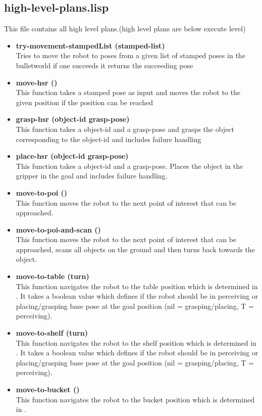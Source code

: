 \documentclass[main.tex]{subfiles}
\begin{document}
	    \subsection{high-level-plans.lisp}
	    \label{high-level}
	    This file contains all high level plans.(high level plans are below execute level)
	    \begin{itemize}
		\item \textbf{try-movement-stampedList (stamped-list)} \\
		Tries to move the robot to poses from a given list of stamped poses in the bulletworld if one succeeds it returns the succeeding pose 
	    \item \textbf{move-hsr ()} \\
	    This function takes a stamped pose as input and moves the robot to the given position if the position can be reached
	    \item \textbf{grasp-hsr (object-id grasp-pose)} \\
	    This function takes a object-id and a grasp-pose and grasps the object corresponding to the object-id and includes failure handling
	    \item \textbf{place-hsr (object-id grasp-pose)} \\
	    This function takes a object-id and a grasp-pose. Places the object in the gripper in the goal and includes failure handling.
	    \item \textbf{move-to-poi ()} \\
	    This function moves the robot to the next point of interest that can be approached. 
	    \item \textbf{move-to-poi-and-scan ()} \\
	    This function moves the robot to the next point of interest that can be approached, scans all objects on the ground and then turns back towards the object.
	    \item \textbf{move-to-table (turn)} \\
	    This function navigates the robot to the table position which is determined in . It takes a boolean value which defines if the robot should be in perceiving or placing/grasping base pose at the goal position (nil = grasping/placing, T = perceiving). 
	    \item \textbf{move-to-shelf (turn)} \\
	    This function navigates the robot to the shelf position which is determined in . It takes a boolean value which defines if the robot should be in perceiving or placing/grasping base pose at the goal position (nil = grasping/placing, T = perceiving).
	    \item \textbf{move-to-bucket ()} \\
	    This function navigates the robot to the bucket position which is determined in .  
		\end{itemize}
\end{document}
